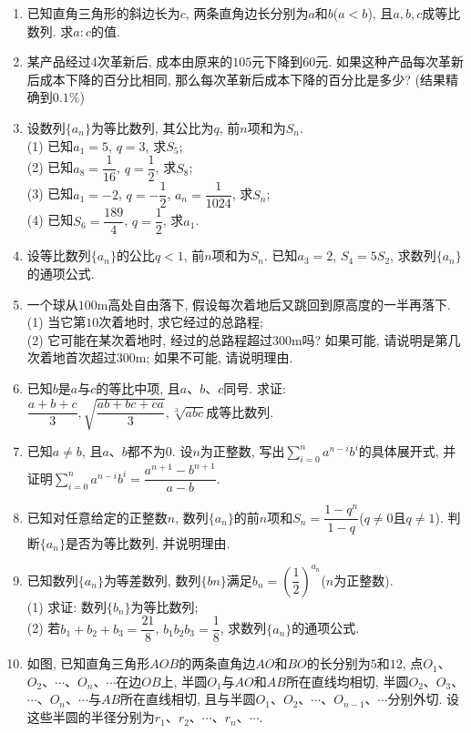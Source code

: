 \documentclass[10pt,a4paper]{article}
\begin{document}
\begin{enumerate}[1.]
\item 已知直角三角形的斜边长为$c$, 两条直角边长分别为$a$和$b$($a<b$), 且$a, b, c$成等比数列. 求$a:c$的值.
\item 某产品经过$4$次革新后, 成本由原来的$105$元下降到$60$元. 如果这种产品每次革新后成本下降的百分比相同, 那么每次革新后成本下降的百分比是多少? (结果精确到$0.1\%$)
\item 设数列$\{a_n\}$为等比数列, 其公比为$q$, 前$n$项和为$S_n$.\\
(1) 已知$a_1=5$, $q=3$, 求$S_5$;\\
(2) 已知$a_8=\dfrac1{16}$, $q=\dfrac 12$, 求$S_8$;\\
(3) 已知$a_1=-2$, $q=-\dfrac 12$, $a_n= \dfrac 1{1024}$, 求$S_n$;\\
(4) 已知$S_6=\dfrac{189}4$, $q=\dfrac 12$, 求$a_1$.
\item 设等比数列$\{a_n\}$的公比$q<1$, 前$n$项和为$S_n$. 已知$a_3=2$, $S_4=5S_2$, 求数列$\{a_n\}$的通项公式.
\item 一个球从$100\text{m}$高处自由落下, 假设每次着地后又跳回到原高度的一半再落下.\\
(1) 当它第$10$次着地时, 求它经过的总路程;\\
(2) 它可能在某次着地时, 经过的总路程超过$300\text{m}$吗? 如果可能, 请说明是第几次着地首次超过$300\text{m}$; 如果不可能, 请说明理由.
\item 已知$b$是$a$与$c$的等比中项, 且$a$、$b$、$c$同号. 求证: $\dfrac{a+b+c}3,\sqrt{\dfrac{ab+bc+ca}3}, \sqrt[3]{abc}$成等比数列.
\item 已知$a\ne b$, 且$a$、$b$都不为$0$. 设$n$为正整数, 写出$\displaystyle\sum_{i=0}^na^{n-i}b^i$的具体展开式, 并证明$\displaystyle\sum_{i=0}^na^{n-i}b^i=\dfrac{a^{n+1}-b^{n+1}}{a-b}$.
\item 已知对任意给定的正整数$n$, 数列$\{a_n\}$的前$n$项和$S_n=\dfrac{1-q^n}{1-q}$($q\ne 0$且$q\ne 1$). 判断$\{a_n\}$是否为等比数列, 并说明理由.
\item 已知数列$\{a_n\}$为等差数列, 数列$\{bn\}$满足$b_n=(\dfrac 12)^{a_n}$($n$为正整数).\\
(1) 求证: 数列$\{b_n\}$为等比数列;\\
(2) 若$b_1+b_2+b_3=\dfrac{21}8$, $b_1b_2b_3=\dfrac 18$, 求数列$\{a_n\}$的通项公式.
\item 如图, 已知直角三角形$AOB$的两条直角边$AO$和$BO$的长分别为$5$和$12$, 点$O_1$、$O_2$、$\cdots$、$O_n$、$\cdots$在边$OB$上, 半圆$O_1$与$AO$和$AB$所在直线均相切, 半圆$O_2$、$O_3$、$\cdots$、$O_n$、$\cdots$与$AB$所在直线相切, 且与半圆$O_1$、$O_2$、$\cdots$、$O_{n-1}$、$\cdots$分别外切. 设这些半圆的半径分别为$r_1$、$r_2$、$\cdots$、$r_n$、$\cdots$.\\

\end{enumerate}
\end{document}
